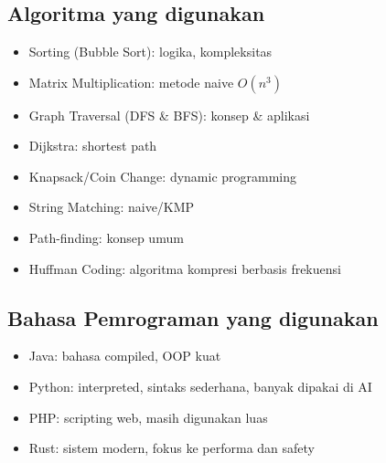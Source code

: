 \chapter{\babDua}
\label{bab:2}


\section{Algoritma yang digunakan}
\label{sec:algoritma}
\begin{itemize}
	\item Sorting (Bubble Sort): logika, kompleksitas
	\item Matrix Multiplication: metode naive $O(n^3)$
	\item Graph Traversal (DFS \& BFS): konsep \& aplikasi
	\item Dijkstra: shortest path
	\item Knapsack/Coin Change: dynamic programming
	\item String Matching: naive/KMP
	\item Path-finding: konsep umum
	\item Huffman Coding: algoritma kompresi berbasis frekuensi
\end{itemize}

\section{Bahasa Pemrograman yang digunakan}
\label{sec:bahasaPemrograman}
\begin{itemize}
	\item Java: bahasa compiled, OOP kuat
	\item Python: interpreted, sintaks sederhana, banyak dipakai di AI
	\item PHP: scripting web, masih digunakan luas
	\item Rust: sistem modern, fokus ke performa dan safety
\end{itemize}

